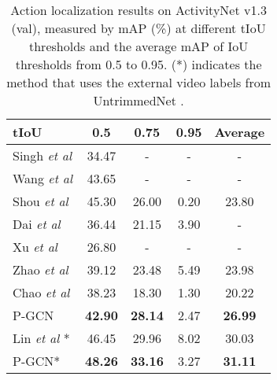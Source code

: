 \documentclass[10pt,twocolumn,letterpaper]{article}
\def\etal{\emph{et al}\onedot}
\begin{document}
	\begin{table}[!t]
		\centering
		\caption{Action localization results on ActivityNet v1.3 (val), measured by mAP (\%) at different tIoU thresholds and the average mAP of IoU thresholds from 0.5 to 0.95. (*) indicates the method that uses the external video labels from UntrimmedNet \cite{wang2017untrimmed}.}
		\vspace{0.1cm}
\begin{tabular}{lccc|c}
			\hline
			tIoU                         & 0.5           & 0.75          & 0.95           & Average              \\ \hline
			Singh \etal  \cite{singh2016untrimmed}        & 34.47        & -             & -               & -                 \\
			Wang \etal   \cite{wang2016uts}        & 43.65        & -             & -               & -                 \\
			Shou \etal \cite{shou2017cdc}         & 45.30             & 26.00             & 0.20          & 23.80                      \\
			Dai \etal \cite{dai2017temporal}        & 36.44             & 21.15             & 3.90             & -                        \\
			Xu \etal \cite{xu2017r}         & 26.80          & -          & -          & -                         \\
			Zhao \etal \cite{zhao2017temporal}        & 39.12 & 23.48          & 5.49           & 23.98                       \\ 
			Chao \etal  \cite{chao2018rethinking}          & 38.23          & 18.30          & 1.30          & 20.22         \\  
			P-GCN                & \textbf{42.90}         & \textbf{28.14} & 2.47 & \textbf{26.99}  \\ \hline 
			Lin \etal  \cite{lin2018bsn} *    & 46.45        & 29.96          & 8.02        & 30.03 \\ 
			P-GCN* & \textbf{48.26}  & \textbf{33.16} & 3.27 & \textbf{31.11} \\
			\hline
		\end{tabular}
\label{Tab:anet}
	\end{table}
	
\end{document}
